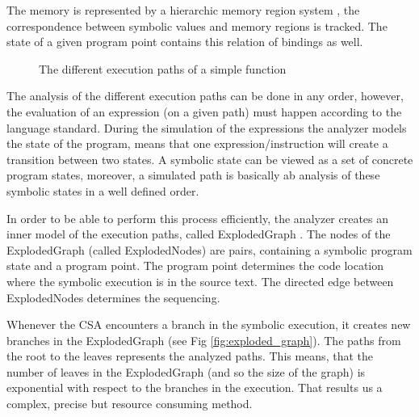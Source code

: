 \documentclass[oneside, a4paper, 12pt]{article}
\theoremstyle{definition}
\begin{document}
The memory is represented by a hierarchic memory region system 
\cite{clang:memmodel}, the correspondence between symbolic values and memory 
regions is tracked. The state of a given program point contains this relation 
of bindings as well.

\begin{figure}[h]
	\centering
	\caption{The different execution paths of a simple function}
	\label{fig:exec_path}
\end{figure}

The analysis of the different execution paths can be done in any order, however, the evaluation of an expression (on a given path) must happen according to the language standard. 
During the simulation of the expressions the analyzer models the state of the program, means that one expression/instruction will create a transition between two states. A symbolic state can be viewed as a set of concrete program states, moreover, a simulated path is basically ab analysis of these symbolic states in a well defined order. 

In order to be able to perform this process efficiently, the analyzer creates an inner model of the execution paths, called ExplodedGraph \cite{explodedgraph}. The nodes of the ExplodedGraph (called ExplodedNodes) are pairs, containing a symbolic program state and a program point. The program point determines the code location where the symbolic execution is in the source text. The directed edge between ExplodedNodes determines the sequencing.

Whenever the CSA encounters a branch in the symbolic execution, it creates new branches in the ExplodedGraph (see Fig \ref{fig:exploded_graph}). The paths from the root to the leaves represents the analyzed paths. This means, that the number of leaves in the ExplodedGraph (and so the size of the graph) is exponential with respect to the branches in the execution. That results us a complex, precise but resource consuming method.
\end{document}
